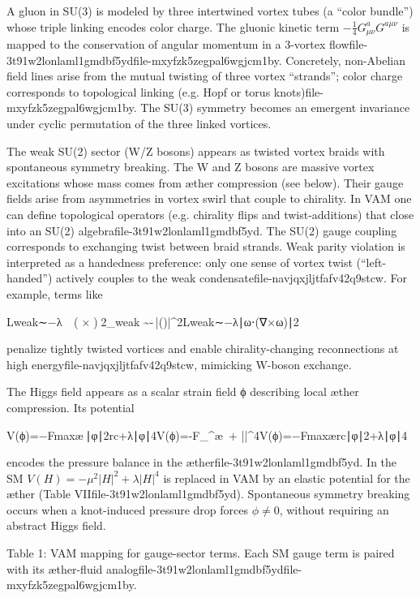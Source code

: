 \documentclass[a4paper,12pt]{article}
\begin{document}
A gluon in SU(3) is modeled by three intertwined vortex tubes (a “color bundle”) whose triple linking encodes color charge.  The gluonic kinetic term $-\frac14G^a_{\mu\nu}G^{a\mu\nu}$ is mapped to the conservation of angular momentum in a 3-vortex flowfile-3t91w2lonlaml1gmdbf5ydfile-mxyfzk5zegpal6wgjcm1by.  Concretely, non-Abelian field lines arise from the mutual twisting of three vortex “strands”; color charge corresponds to topological linking (e.g. Hopf or torus knots)file-mxyfzk5zegpal6wgjcm1by.  The SU(3) symmetry becomes an emergent invariance under cyclic permutation of the three linked vortices.


The weak SU(2) sector (W/Z bosons) appears as twisted vortex braids with spontaneous symmetry breaking.  The W and Z bosons are massive vortex excitations whose mass comes from æther compression (see below).  Their gauge fields arise from asymmetries in vortex swirl that couple to chirality.  In VAM one can define topological operators (e.g. chirality flips and twist-additions) that close into an SU(2) algebrafile-3t91w2lonlaml1gmdbf5yd.  The SU(2) gauge coupling corresponds to exchanging twist between braid strands.  Weak parity violation is interpreted as a handedness preference: only one sense of vortex twist (“left-handed”) actively couples to the weak condensatefile-navjqxjljtfafv42q9stcw.  For example, terms like

Lweak∼−λ ∣ω⃗⋅(∇×ω⃗)∣2_{\rm weak} \sim -\lambda\,|\vec{\omega}\cdot(\nabla\times\vec{\omega})|^2Lweak​∼−λ∣ω⋅(∇×ω)∣2

penalize tightly twisted vortices and enable chirality-changing reconnections at high energyfile-navjqxjljtfafv42q9stcw, mimicking W-boson exchange.


The Higgs field appears as a scalar strain field ϕ describing local æther compression.  Its potential

V(ϕ)=−Fmaxæ ∣φ∣2rc+λ∣φ∣4V(ϕ)=-F_{}^{æ}\, + \lambda|\varphi|^4V(ϕ)=−Fmaxæ​rc​∣φ∣2​+λ∣φ∣4

encodes the pressure balance in the ætherfile-3t91w2lonlaml1gmdbf5yd.  In the SM $V(H)=-\mu^2|H|^2+\lambda|H|^4$ is replaced in VAM by an elastic potential for the æther (Table VIIfile-3t91w2lonlaml1gmdbf5yd).  Spontaneous symmetry breaking occurs when a knot-induced pressure drop forces $ϕ\neq0$, without requiring an abstract Higgs field.


Table 1: VAM mapping for gauge-sector terms. Each SM gauge term is paired with its æther-fluid analogfile-3t91w2lonlaml1gmdbf5ydfile-mxyfzk5zegpal6wgjcm1by.
\end{document}
